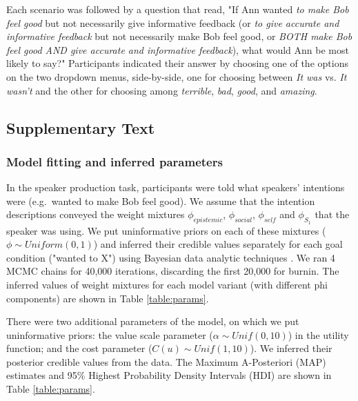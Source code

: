 \documentclass[12pt]{article}
\begin{document}
Each scenario was followed by a question that read, "If Ann wanted \emph{to make Bob feel good} but not necessarily give informative feedback (or \emph{to give accurate and informative feedback} but not necessarily make Bob feel good, or \emph{BOTH make Bob feel good AND give accurate and informative feedback}), what would Ann be most likely to say?" Participants indicated their answer by choosing one of the options on the two dropdown menus, side-by-side, one for choosing between \emph{It was} vs. \emph{It wasn't} and the other for choosing among \emph{terrible}, \emph{bad}, \emph{good}, and \emph{amazing}.

\subsection*{Supplementary Text}

\subsubsection*{Model fitting and inferred parameters}

In the speaker production task, participants were told what speakers' intentions were 
(e.g.~wanted to make Bob feel good). 
We assume that the intention descriptions conveyed the weight mixtures $\phi_{epistemic}$, $\phi_{social}$, $\phi_{self}$ and $\phi_{S_1}$ that the speaker was using. 
We put uninformative priors on each of these mixtures ($\phi \sim Uniform(0,1)$) 
and inferred their credible values separately for each goal condition ("wanted to X") 
using Bayesian data analytic techniques \cite{lee2014}. 
We ran 4 MCMC chains for 40,000 iterations, discarding the first 20,000 for burnin. 
The inferred values of weight mixtures for each model variant (with different phi components) are shown in Table \ref{table:params}.

There were two additional parameters of the model, on which we put uninformative priors: the value scale parameter ($\alpha \sim Unif(0,10)$) in the utility function; and the cost parameter ($C(u) \sim Unif(1,10)$). We inferred their posterior credible values from the data. The Maximum A-Posteriori (MAP) estimates and 95\% Highest Probability Density Intervals (HDI) are shown in Table \ref{table:params}.
\end{document}
